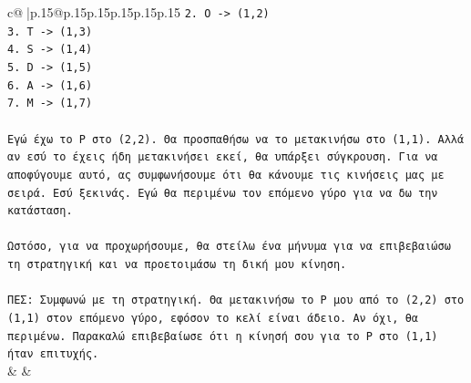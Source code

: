 \documentclass{article}
\begin{document}
{\begin{supertabular}{c@{$\;$}|p{.15\linewidth}@{}p{.15\linewidth}p{.15\linewidth}p{.15\linewidth}p{.15\linewidth}p{.15\linewidth}}
{{{\texttt{2. O {-}> (1,2)} \\
\texttt{3. T {-}> (1,3)} \\
\texttt{4. S {-}> (1,4)} \\
\texttt{5. D {-}> (1,5)} \\
\texttt{6. A {-}> (1,6)} \\
\texttt{7. M {-}> (1,7)} \\
\\ 
\texttt{Εγώ έχω το P στο (2,2). Θα προσπαθήσω να το μετακινήσω στο (1,1). Αλλά αν εσύ το έχεις ήδη μετακινήσει εκεί, θα υπάρξει σύγκρουση. Για να αποφύγουμε αυτό, ας συμφωνήσουμε ότι θα κάνουμε τις κινήσεις μας με σειρά. Εσύ ξεκινάς. Εγώ θα περιμένω τον επόμενο γύρο για να δω την κατάσταση.} \\
\\ 
\texttt{Ωστόσο, για να προχωρήσουμε, θα στείλω ένα μήνυμα για να επιβεβαιώσω τη στρατηγική και να προετοιμάσω τη δική μου κίνηση.} \\
\\ 
\texttt{ΠΕΣ: Συμφωνώ με τη στρατηγική. Θα μετακινήσω το P μου από το (2,2) στο (1,1) στον επόμενο γύρο, εφόσον το κελί είναι άδειο. Αν όχι, θα περιμένω. Παρακαλώ επιβεβαίωσε ότι η κίνησή σου για το P στο (1,1) ήταν επιτυχής.} \\
            }
        }
    }
    & & \\ \\


\end{supertabular}}
\end{document}
